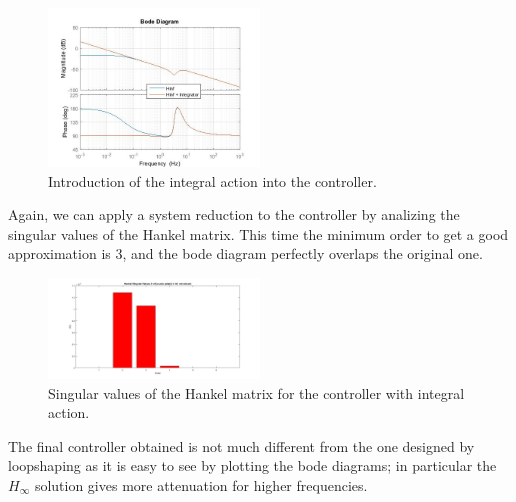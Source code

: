 \begin{figure}[h]
\centering
\includegraphics[width=0.5\textwidth]{img/hinf_integrator.jpg}
\caption{Introduction of the integral action into the controller.}
\end{figure}

Again, we can apply a system reduction to the controller by analizing the singular values of the Hankel matrix. This time the minimum order to get a good approximation is 3, and the bode diagram perfectly overlaps the original one.\\

\begin{figure}[h]
\centering
\includegraphics[width=0.5\textwidth]{img/hinf_hankel_int.jpg}
\caption{Singular values of the Hankel matrix for the controller with integral action.}
\end{figure}

The final controller obtained is not much different from the one designed by loopshaping as it is easy to see by plotting the bode diagrams; in particular the $H_\infty$ solution gives more attenuation for higher frequencies.\\

